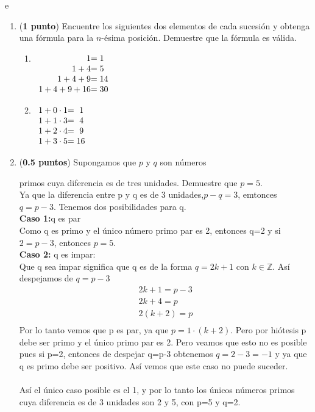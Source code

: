 e\documentclass[fontsize=12pt]{scrartcl}
\begin{document}
\begin{enumerate}
		\item ({\bf 1 punto}) Encuentre los siguientes dos elementos de 
		cada sucesi\'on y obtenga una f\'ormula para la $n$-\'esima 
		posici\'on. Demuestre que la f\'ormula es v\'alida.
			\begin{enumerate}
			\item $\begin{array}[t]{r@{}l}
				1 			&= 	1	\\
				1 + 4 		&= 	5	\\
				1 + 4 + 9 		&= 	14	\\
				1 + 4 + 9 + 16 	&= 	30
			\end{array}$
			\item $\begin{array}[t]{r@{}l}
				1 + 0 \cdot 1 	&= 	\ 1 	\\
				1 + 1 \cdot 3 	&= 	\ 4 	\\
				1 + 2 \cdot 4 	&= 	\ 9 	\\
				1 + 3 \cdot 5 	&= 	16
			\end{array}$
			\end{enumerate}

		      \item ({\bf 0.5 puntos}) Supongamos que $p$ y $q$ son n\'umeros
                        
		        primos cuya diferencia es de tres unidades. Demuestre que $p = 5$. \\
                        Ya que la diferencia entre p y q es de 3 unidades,$p-q=3$, emtonces $q=p-3$. Tenemos dos posibilidades para q.
                        \\
                        \textbf{Caso 1:}q es par\\
                        Como q es primo y el único número primo par es 2, entonces q=2 y si  $2=p-3$, entonces $p=5$.\\
                        \textbf{Caso 2:} q es impar: \\
                        Que q sea impar significa que q es de la forma $q=2k+1$ con $k \in \mathbb{Z}$. Así despejamos de $q=p-3$
                        \begin{equation*}
                  \begin{split}
                    2k+1 = p-3\\
                    2k +4 = p\\
                    2(k+2) =p \\
                  \end{split}
                   \end{equation*}
                        Por lo tanto vemos que p es par, ya que $p=1 \cdot (k+2)$. Pero por hiótesis p debe ser primo y el único primo par es 2. Pero veamos que esto no es posible pues si p=2, entonces  de despejar q=p-3 obtenemos $q=2-3=-1$ y ya que q es primo debe ser positivo. Así vemos que este caso no puede suceder.\\ \\
                        Así el único caso posible es el 1, y por lo tanto los únicos números primos cuya diferencia es de 3 unidades son 2 y 5, con p=5 y q=2.
                        

\end{enumerate}
\end{document}
